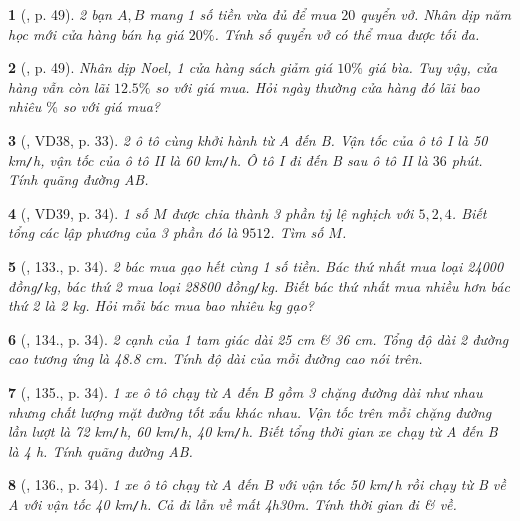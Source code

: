 \documentclass{article}
\newtheorem{baitoan}{}
\begin{document}
\begin{baitoan}[\cite{Binh_boi_duong_Toan_7_tap_1}, p. 49]
	2 bạn $A,B$ mang 1 số tiền vừa đủ để mua $20$ quyển vở. Nhân dịp năm học mới cửa hàng bán hạ giá $20\%$. Tính số quyển vở có thể mua được tối đa.
\end{baitoan}

\begin{baitoan}[\cite{Binh_boi_duong_Toan_7_tap_1}, p. 49]
	Nhân dịp Noel, 1 cửa hàng sách giảm giá $10\%$ giá bìa. Tuy vậy, cửa hàng vẫn còn lãi $12.5\%$ so với giá mua. Hỏi ngày thường cửa hàng đó lãi bao nhiêu $\%$ so với giá mua?
\end{baitoan}

\begin{baitoan}[\cite{Tuyen_Toan_7}, VD38, p. 33]
	2 ô tô cùng khởi hành từ A đến B. Vận tốc của ô tô I là {\rm50 km{\tt/}h}, vận tốc của ô tô II là {\rm60 km{\tt/}h}. Ô tô I đi đến B sau ô tô II là $36$ phút. Tính quãng đường AB.
\end{baitoan}

\begin{baitoan}[\cite{Tuyen_Toan_7}, VD39, p. 34]
	1 số $M$ được chia thành 3 phần tỷ lệ nghịch với $5,2,4$. Biết tổng các lập phương của 3 phần đó là $9512$. Tìm số $M$.
\end{baitoan}

\begin{baitoan}[\cite{Tuyen_Toan_7}, 133., p. 34]
	2 bác mua gạo hết cùng 1 số tiền. Bác thứ nhất mua loại {\rm24000 đồng{\tt/}kg}, bác thứ 2 mua loại {\rm28800 đồng{\tt/}kg}. Biết bác thứ nhất mua nhiều hơn bác thứ 2 là {\rm2 kg}. Hỏi mỗi bác mua bao nhiêu {\rm kg} gạo?
\end{baitoan}

\begin{baitoan}[\cite{Tuyen_Toan_7}, 134., p. 34]
	2 cạnh của 1 tam giác dài {\rm25 cm} \& {\rm36 cm}. Tổng độ dài 2 đường cao tương ứng là {\rm48.8 cm}. Tính độ dài của mỗi đường cao nói trên.
\end{baitoan}

\begin{baitoan}[\cite{Tuyen_Toan_7}, 135., p. 34]
	1 xe ô tô chạy từ A đến B gồm 3 chặng đường dài như nhau nhưng chất lượng mặt đường tốt xấu khác nhau. Vận tốc trên mỗi chặng đường lần lượt là {\rm72 km{\tt/}h}, {\rm60 km{\tt/}h}, {\rm40 km{\tt/}h}. Biết tổng thời gian xe chạy từ A đến B là {\rm4 h}. Tính quãng đường AB.
\end{baitoan}

\begin{baitoan}[\cite{Tuyen_Toan_7}, 136., p. 34]	
	1 xe ô tô chạy từ A đến B với vận tốc {\rm50 km{\tt/}h} rồi chạy từ B về A với vận tốc {\rm40 km{\tt/}h}. Cả đi lẫn về mất {\rm4h30m}. Tính thời gian đi \& về.
\end{baitoan}
\end{document}
